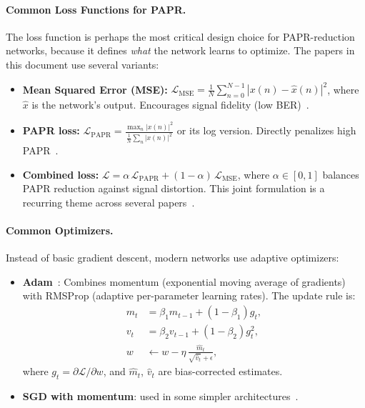 \paragraph{Common Loss Functions for PAPR.}
The loss function is perhaps the most critical design choice for
PAPR-reduction networks, because it defines \emph{what} the network
learns to optimize.  The papers in this document use several variants:
\begin{itemize}
    \item \textbf{Mean Squared Error (MSE):}
          $\mathcal{L}_{\mathrm{MSE}} =
          \frac{1}{N}\sum_{n=0}^{N-1}|x(n) - \hat{x}(n)|^2$,
          where $\hat{x}$ is the network's output.
          Encourages signal fidelity (low BER)~\cite{kim2017novel,zou2021novel}.
    \item \textbf{PAPR loss:}
          $\mathcal{L}_{\mathrm{PAPR}} =
          \frac{\max_n|x(n)|^2}{\frac{1}{N}\sum_n|x(n)|^2}$
          or its log version.
          Directly penalizes high PAPR~\cite{kim2017novel,nguyen2022deep}.
    \item \textbf{Combined loss:}
          $\mathcal{L} = \alpha\,\mathcal{L}_{\mathrm{PAPR}} +
          (1-\alpha)\,\mathcal{L}_{\mathrm{MSE}}$,
          where $\alpha \in [0,1]$ balances PAPR reduction against
          signal distortion.  This joint formulation is a recurring
          theme across several papers~\cite{kim2017novel,zou2021novel}.
\end{itemize}

\paragraph{Common Optimizers.}
Instead of basic gradient descent, modern networks use adaptive optimizers:
\begin{itemize}
    \item \textbf{Adam}~\cite{kim2017novel,nguyen2022deep}:
          Combines momentum (exponential moving average of gradients)
          with RMSProp (adaptive per-parameter learning rates).
          The update rule is:
          \begin{align}
              m_t &= \beta_1 m_{t-1} + (1-\beta_1) g_t, \label{eq:adam_m}\\
              v_t &= \beta_2 v_{t-1} + (1-\beta_2) g_t^2, \label{eq:adam_v}\\
              w &\leftarrow w - \eta\,\frac{\hat{m}_t}{\sqrt{\hat{v}_t} + \epsilon}, \label{eq:adam_update}
          \end{align}
          where $g_t = \partial\mathcal{L}/\partial w$, and $\hat{m}_t$,
          $\hat{v}_t$ are bias-corrected estimates.
    \item \textbf{SGD with momentum}: used in some
          simpler architectures~\cite{hao2019extended}.
\end{itemize}


